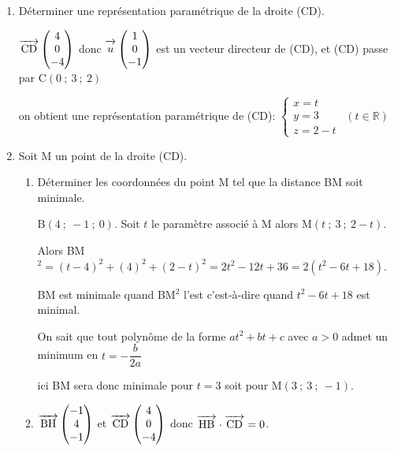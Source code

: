 \documentclass[11pt,a4paper,answers,fancyhdr]{exam}
\newcommand{\vect}[1]{\overrightarrow{\,\mathstrut#1\,}}
\newcommand{\R}{\mathbb{R}}
\begin{document}
\begin{enumerate}
\item Déterminer une représentation paramétrique de la droite (CD).

\begin{solution}
$\vect{\text{CD}}\begin{pmatrix}
4\\0\\-4
\end{pmatrix}$ donc $\vect{u}\begin{pmatrix}
1\\0\\-1
\end{pmatrix}$ est un vecteur directeur 
de (CD), et (CD) passe par C$(0~;~3~;~2)$ 

on obtient une représentation paramétrique de (CD): $\begin{cases}
x=t\\y=3\\z=2-t
\end{cases}~~(t\in \R)$
\end{solution}

\item Soit M un point de la droite (CD).
	\begin{enumerate}
		\item Déterminer les coordonnées du point M tel que la distance BM soit minimale.
		
		\begin{solution}B$(4~;~-1~;~0)$. 		
		Soit $t$ le paramètre associé à M alors M$(t~;~3~;~2-t)$. 
		
Alors BM$^2=\left(t-4 \right)^2+\left(4 \right)^2+\left(2-t \right)^2=2t^2-12t+36=2(t^2-6t+18)$. 
		
BM est minimale quand BM$^2$ l'est c'est-à-dire quand $t^2 - 6t + 18$ est minimal.
		
On sait que tout polynôme de la forme $at^2+bt+c$ avec $a > 0$ admet un minimum en $t = -\dfrac{b}{2a}$
		
ici BM sera donc minimale pour $t = 3$ soit pour M$(3~;~3~;~-1)$.
	
\end{solution}
		
		\item %

\begin{solution}
$\vect{\text{BH}}\begin{pmatrix}
-1\\4\\-1
\end{pmatrix}$ et $\vect{\text{CD}}\begin{pmatrix}
4\\0\\-4
\end{pmatrix}$ donc $\vect{\text{HB}}\cdot \vect{\text{CD}} = 0$.


\end{solution}
\end{enumerate}
\end{enumerate}
\end{document}
